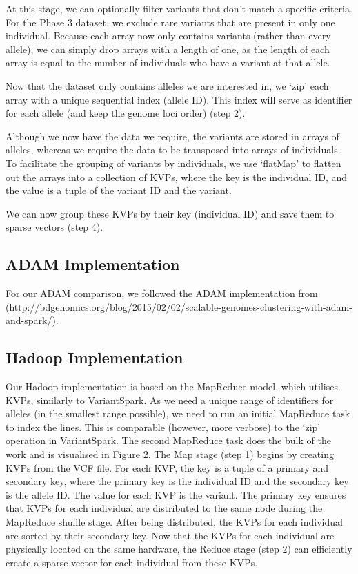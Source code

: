 \documentclass{bmcart}
\newcommand{\variantSpark}{{\sc VariantSpark}}
\begin{document}
At this stage, we can optionally filter variants that don't match a specific criteria. For the Phase 3 dataset, we exclude rare variants that are present in
only one individual. Because each array now only contains variants (rather than every allele), we can simply drop arrays with a length of one, as the length
of each array is equal to the number of individuals who have a variant at that allele.

Now that the dataset only contains alleles we are interested in, we `zip' each array with a unique sequential index (allele ID). This index will serve
as identifier for each allele (and keep the genome loci order) (step 2).

Although we now have the data we require, the variants are stored in arrays of alleles, whereas we require the data to be transposed into arrays of individuals.
To facilitate the grouping of variants by individuals, we use `flatMap' to flatten out the arrays into a collection of KVPs, where the key is the individual ID, and the
value is a tuple of the variant ID and the variant.

We can now group these KVPs by their key (individual ID) and save them to sparse vectors (step 4).


\subsection*{{\sc ADAM} Implementation}
For our {\sc ADAM} comparison, we followed the {\sc ADAM} implementation from (\url{http://bdgenomics.org/blog/2015/02/02/scalable-genomes-clustering-with-adam-and-spark/}).

\subsection*{Hadoop Implementation}
Our Hadoop implementation is based on the MapReduce model, which utilises KVPs, similarly to \variantSpark{}.
As we need a unique range of identifiers for alleles (in the smallest range possible), we need to run an initial MapReduce task to index the lines. This is comparable (however, more verbose) to the `zip' operation in \variantSpark{}.
The second MapReduce task does the bulk of the work and is visualised in Figure 2. The Map stage (step 1) begins by creating KVPs from the VCF file. For each KVP, the key is a tuple of a primary and secondary key, where the primary key is the individual ID and the secondary key is the allele ID. The value for each KVP is the variant.
The primary key ensures that KVPs for each individual are distributed to the same node during the MapReduce shuffle stage. After being distributed, the KVPs for each individual are sorted by their secondary key.
Now that the KVPs for each individual are physically located on the same hardware, the Reduce stage (step 2) can efficiently create a sparse vector for each individual from these KVPs. 
\end{document}
